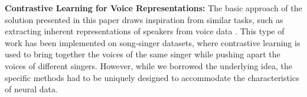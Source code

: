 \textbf{Contrastive Learning for Voice Representations:} The basic approach of the solution presented in this paper draws inspiration from similar tasks, such as extracting inherent representations of speakers from voice data \cite{torres2024singer}. This type of work has been implemented on song-singer datasets, where contrastive learning is used to bring together the voices of the same singer while pushing apart the voices of different singers. However, while we borrowed the underlying idea, the specific methods had to be uniquely designed to accommodate the characteristics of neural data.
